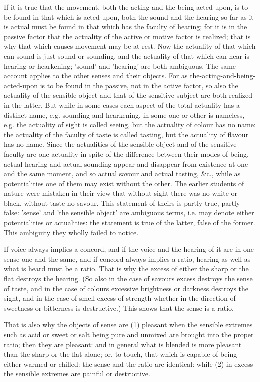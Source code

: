 If it is true that the movement, both the acting and the being acted
upon, is to be found in that which is acted upon, both the sound and
the hearing so far as it is actual must be found in that which has
the faculty of hearing; for it is in the passive factor that the actuality
of the active or motive factor is realized; that is why that which
causes movement may be at rest. Now the actuality of that which can
sound is just sound or sounding, and the actuality of that which can
hear is hearing or hearkening; 'sound' and 'hearing' are both ambiguous.
The same account applies to the other senses and their objects. For
as the-acting-and-being-acted-upon is to be found in the passive,
not in the active factor, so also the actuality of the sensible object
and that of the sensitive subject are both realized in the latter.
But while in some cases each aspect of the total actuality has a distinct
name, e.g. sounding and hearkening, in some one or other is nameless,
e.g. the actuality of sight is called seeing, but the actuality of
colour has no name: the actuality of the faculty of taste is called
tasting, but the actuality of flavour has no name. Since the actualities
of the sensible object and of the sensitive faculty are one actuality
in spite of the difference between their modes of being, actual hearing
and actual sounding appear and disappear from existence at one and
the same moment, and so actual savour and actual tasting, &c., while
as potentialities one of them may exist without the other. The earlier
students of nature were mistaken in their view that without sight
there was no white or black, without taste no savour. This statement
of theirs is partly true, partly false: 'sense' and 'the sensible
object' are ambiguous terms, i.e. may denote either potentialities
or actualities: the statement is true of the latter, false of the
former. This ambiguity they wholly failed to notice. 

If voice always implies a concord, and if the voice and the hearing
of it are in one sense one and the same, and if concord always implies
a ratio, hearing as well as what is heard must be a ratio. That is
why the excess of either the sharp or the flat destroys the hearing.
(So also in the case of savours excess destroys the sense of taste,
and in the case of colours excessive brightness or darkness destroys
the sight, and in the case of smell excess of strength whether in
the direction of sweetness or bitterness is destructive.) This shows
that the sense is a ratio. 

That is also why the objects of sense are (1) pleasant when the sensible
extremes such as acid or sweet or salt being pure and unmixed are
brought into the proper ratio; then they are pleasant: and in general
what is blended is more pleasant than the sharp or the flat alone;
or, to touch, that which is capable of being either warmed or chilled:
the sense and the ratio are identical: while (2) in excess the sensible
extremes are painful or destructive. 

